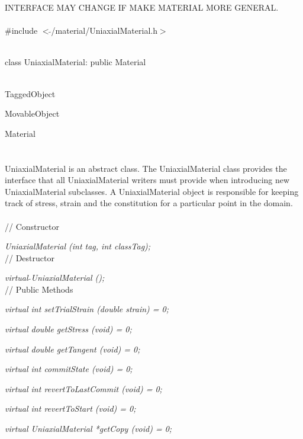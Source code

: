 
INTERFACE MAY CHANGE IF MAKE MATERIAL MORE GENERAL. \\

   \\
\#include $<\tilde{ }$/material/UniaxialMaterial.h$>$  


  \\
class UniaxialMaterial: public Material 


 \\
TaggedObject 

MovableObject 

\indent\indent Material \\
\indent\indent{} \\

  \\
\indent UniaxialMaterial is an abstract class. The
UniaxialMaterial class provides the interface that all
UniaxialMaterial writers must provide when introducing new
UniaxialMaterial subclasses. A UniaxialMaterial object 
is responsible for keeping track of stress, strain and the
constitution for a particular point in the domain. \\ 

 \\
// Constructor 

{\em UniaxialMaterial (int tag, int classTag);}  \\ 

// Destructor 

{\em virtual $\tilde{ }$UniaxialMaterial ();}\\ 

// Public Methods 

{\em virtual int setTrialStrain (double strain) = 0; } 

{\em virtual double getStress (void) = 0; } 

{\em virtual double getTangent (void) = 0; } 

{\em virtual int commitState (void) = 0; } 

{\em virtual int revertToLastCommit (void) = 0; } 

{\em virtual int revertToStart (void) = 0; } 

{\em virtual UniaxialMaterial *getCopy (void) = 0; } 



